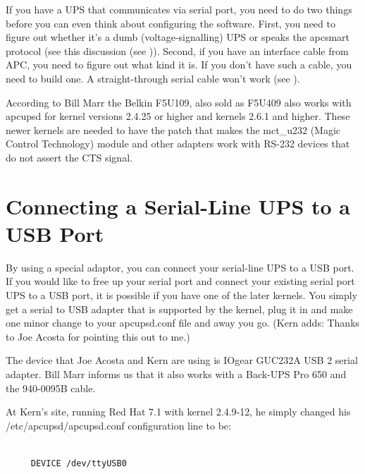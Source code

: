 {{{{{{{{{{\label{index-Serial-UPSes-189}
If you have a UPS that communicates via serial port, you need to do two things
before you can even think about configuring the software. First, you need to
figure out whether it's a dumb (voltage-signalling) UPS or speaks the apcsmart
protocol (see this discussion (see 
)).  Second, if you have an interface
cable from APC, you need to figure out what kind it is.  If you don't have
such a cable, you need to build one.  A straight-through serial cable won't
work (see 
).  

According to Bill Marr the Belkin F5U109, also sold as F5U409 also works with
apcupsd for kernel versions 2.4.25 or higher and kernels 2.6.1 and higher. 
These newer kernels are needed to have the patch that makes the mct\_u232
(Magic Control Technology) module and other adapters work with RS-232 devices
that do not assert the CTS signal. 

\label{Connecting-a-Serial_002dLine-UPS-to-a-USB-Port}

\section*{Connecting a Serial-Line UPS to a USB Port}

\label{index-Serial-on-USB-190}
By using a special adaptor, you can connect your serial-line UPS to a USB
port. If you would like to free up your serial port and connect your existing
serial port UPS to a USB port, it is possible if you have one of the later
kernels. You simply get a serial to USB adapter that is supported by the
kernel, plug it in and make one minor change to your apcupsd.conf file and
away you go. (Kern adds: Thanks to Joe Acosta for pointing this out to me.)  

The device that Joe Acosta and Kern are using is IOgear GUC232A USB 2 serial
adapter. Bill Marr informs us that it also works with a Back-UPS Pro 650 and
the 940-0095B cable.  

At Kern's site, running Red Hat 7.1 with kernel 2.4.9-12, he simply changed
his /etc/apcupsd/apcupsd.conf configuration line to be: 

\footnotesize
\begin{verbatim}
     
     DEVICE /dev/ttyUSB0
\end{verbatim}
\normalsize

}}}}}}}}}}
